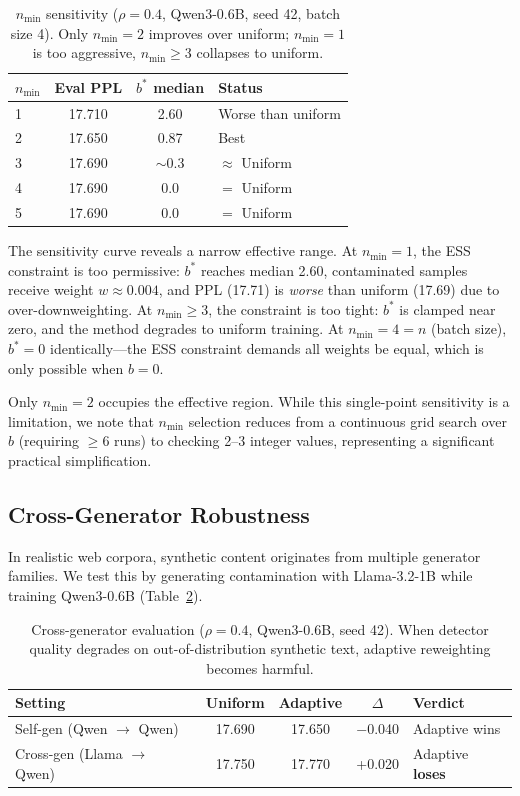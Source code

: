 \documentclass[11pt]{article}
\begin{document}
\begin{table}[t]
\centering
\caption{$n_{\min}$ sensitivity ($\rho = 0.4$, Qwen3-0.6B, seed 42, batch size 4). Only $n_{\min} = 2$ improves over uniform; $n_{\min} = 1$ is too aggressive, $n_{\min} \geq 3$ collapses to uniform.}
\label{tab:nmin}
\small
\begin{tabular}{lccl}
\toprule
$n_{\min}$ & Eval PPL & $b^*$ median & Status \\
\midrule
1 & 17.710 & 2.60 & Worse than uniform \\
2 & 17.650 & 0.87 & Best \\
3 & 17.690 & $\sim$0.3 & $\approx$ Uniform \\
4 & 17.690 & 0.0 & $=$ Uniform \\
5 & 17.690 & 0.0 & $=$ Uniform \\
\bottomrule
\end{tabular}
\end{table}

The sensitivity curve reveals a narrow effective range.
At $n_{\min} = 1$, the ESS constraint is too permissive: $b^*$ reaches median 2.60, contaminated samples receive weight $w \approx 0.004$, and PPL (17.71) is \emph{worse} than uniform (17.69) due to over-downweighting.
At $n_{\min} \geq 3$, the constraint is too tight: $b^*$ is clamped near zero, and the method degrades to uniform training.
At $n_{\min} = 4 = n$ (batch size), $b^* = 0$ identically---the ESS constraint demands all weights be equal, which is only possible when $b = 0$.

Only $n_{\min} = 2$ occupies the effective region.
While this single-point sensitivity is a limitation, we note that $n_{\min}$ selection reduces from a continuous grid search over $b$ (requiring $\geq 6$ runs) to checking 2--3 integer values, representing a significant practical simplification.

\subsection{Cross-Generator Robustness}
\label{sec:cross_gen}

In realistic web corpora, synthetic content originates from multiple generator families.
We test this by generating contamination with Llama-3.2-1B while training Qwen3-0.6B (Table~\ref{tab:cross_gen}).

\begin{table}[t]
\centering
\caption{Cross-generator evaluation ($\rho = 0.4$, Qwen3-0.6B, seed 42). When detector quality degrades on out-of-distribution synthetic text, adaptive reweighting becomes harmful.}
\label{tab:cross_gen}
\small
\begin{tabular}{lcccl}
\toprule
Setting & Uniform & Adaptive & $\Delta$ & Verdict \\
\midrule
Self-gen (Qwen $\to$ Qwen) & 17.690 & 17.650 & $-$0.040 & Adaptive wins \\
Cross-gen (Llama $\to$ Qwen) & 17.750 & 17.770 & +0.020 & Adaptive \textbf{loses} \\
\bottomrule
\end{tabular}
\end{table}
\end{document}
